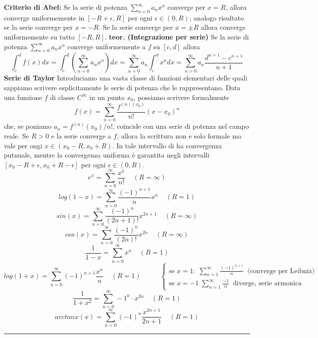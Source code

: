 \textbf{Criterio di Abel:} Se la serie di potenza $\sum_{n=0}^{\infty} a_n x^n$ converge per $x = R$, allora converge uniformemente in $[-R + \epsilon, R]$ per ogni $\epsilon \in (0,R)$; analogo risultato se la serie converge per $x = -R$. Se la serie converge per $x = \pm R$ allora converge uniformemente su tutto $[-R, R]$.\newline
\newline
\textbf{teor. (Integrazione per serie)}\newline
Se la serie di potenza $\sum_{n=0}^{\infty} a_n x^n$ converge uniformemente a $f$ su $[c,d]$ allora
\[
    \int_{c}^{d}f(x) dx = \int_{c}^{d}\left(\sum_{n=0}^{\infty}a_n x^n\right)dx = \sum_{n=0}^{\infty}a_n \int_{c}^{d}x^n dx = \sum_{n=0}^{\infty} a_n \frac{d^{n+1}- c^{n+1}}{n+1}
\]
\newline
\textbf{Serie di Taylor}\newline
Introduciamo una vasta classe di funzioni elementari delle quali sappiamo scrivere esplicitamente le serie di potenza che le rappresentano.\newline
Data una funzione $f$ di classe $C^\infty$ in un punto $x_0$, possiamo scrivere formalmente
\[
    f(x) = \sum_{n=0}^{\infty} \frac{f^{(n)(x_0)}}{n!}(x-x_0)^n
\]
che, se poniamo $a_n = f^{(n)}(x_0)/n!$, coincide con una serie di potenza nel campo reale. Se $R > 0$ e la serie converge a $f$, allora la scrittura non e solo formale ma vale per ongi $x \in (x_0 - R, x_0 + R)$. In tale intervallo di ha convergenza putnuale, mentre la convergenza uniforma è garantita negli intervalli $[x_0 - R + \epsilon, x_0 + R -\epsilon]$ per ogni $\epsilon \in (0,R)$.
\[
    e^x = \sum_{n=0}^{\infty} \frac{x^n}{n!} \;\;\;\; (R= \infty)
\]
\[
    log(1-x) = \sum_{n=0}^{\infty} \frac{(-1)^{n+1}}{n} x^n\;\;\;\; (R=1)
\]
\[
    sin(x) = \sum_{n=0}^{\infty} \frac{(-1)^n}{(2n+1)!} x^{2n+1}\;\;\;\; (R= \infty)
\]
\[
    cos(x) = \sum_{n=0}^{\infty} \frac{(-1)^n}{(2n)!}x^{2n}\;\;\;\; (R= \infty)
\]
\[
    \frac{1}{1-x} = \sum_{n=0}^{\infty} x^n\;\;\;\; (R= 1)
\]
\[
    log(1+x) = \sum_{n=0}^{\infty} (-1)^{n+1} \frac{x^n}{n}\;\;\;\; (R= 1)\;\;\;\;\;\;\;\;\;\;\begin{cases}
        \text{se $x=1: $}\; \sum_{n=1}^{\infty}\frac{(-1)^{n+1}}{n} \;\;\text{(converge per Leibniz)}\;\\
        \text{se $x=-1$}\; \sum_{n=1}^{\infty}\frac{-1}{n} \;\;\text{diverge, serie armonica}\;
    \end{cases}
\]
\[
    \frac{1}{1+x^2} = \sum_{n=0}^{\infty} -1^n \cdot x^{2n} \;\;\;\;(R=1)
\]
\[
    arctanx(x) = \sum_{n=0}^{\infty}(-1)^n \frac{x^{2n+1}}{2n+1} \;\;\;\;(R=1)
\]
\rule{\textwidth}{2pt}
